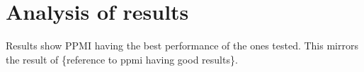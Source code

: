 \chapter{Analysis of results}\label{analysis-of-results}

Results show PPMI having the best performance of the ones tested. This
mirrors the result of \{reference to ppmi having good results\}.
